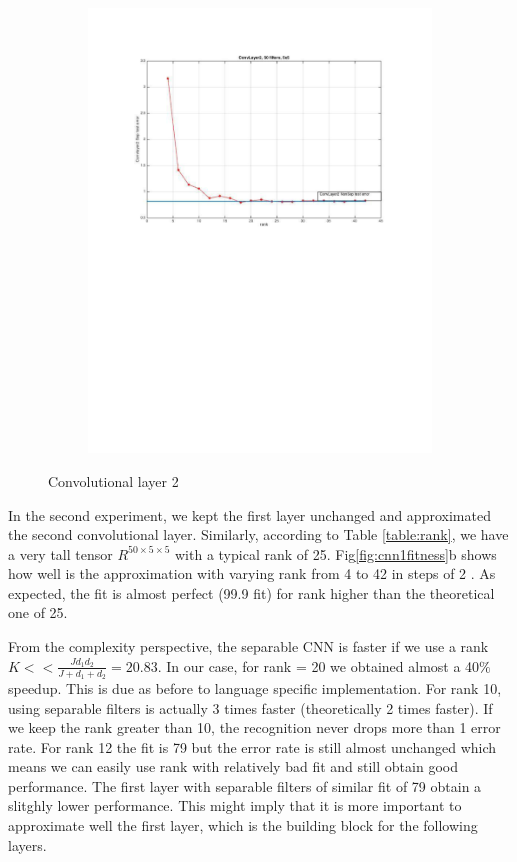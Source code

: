 \begin{figure}[h]
\begin{subfigure}[b]{0.40\textwidth}
    \includegraphics[width=\textwidth]{images/imagesCNN_page1.pdf}
    \caption{}
  \end{subfigure}
  \caption{Convolutional layer 2}
  \label{fig:cnn1error}
\end{figure}

In the second experiment, we kept the first layer unchanged and approximated the second convolutional layer.
Similarly, according to Table \ref{table:rank}, we have a very tall tensor $R^{50\times 5 \times 5}$ with a typical rank of 25.
Fig\ref{fig:cnn1fitness}b shows how well is the approximation with varying rank from 4 to 42 in steps of 2 . As expected, the fit is almost perfect (99.9 fit) for rank higher than the theoretical one of 25.

From the complexity perspective, the separable CNN is faster if we use a rank $K << \frac{Jd_{1}d_{2}}{J +d_{1}+d_{2}} = 20.83$. In our case, for rank = 20 we obtained almost a 40$\%$ speedup. This is due as before to language specific implementation.
For rank 10, using separable filters is actually 3 times faster (theoretically 2 times faster).
If we keep the rank greater than 10, the recognition never drops more than 1 error rate.
For rank 12 the fit is 79 but the error rate is still almost unchanged which means we can easily use rank with relatively bad fit and still obtain good performance. The first layer with separable filters of similar fit of 79 obtain a slitghly lower performance. This might imply that it is more important to approximate well the first layer, which is the building block for the following layers.
